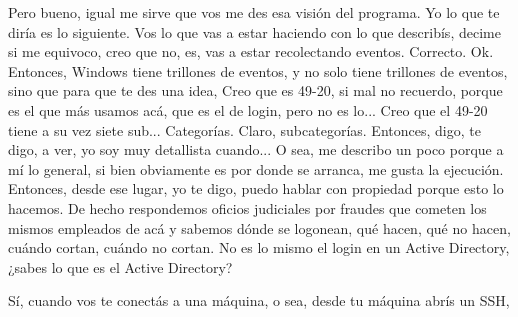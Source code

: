 \begin{description}[leftmargin=0cm, labelsep=0.5cm]
    \item[\textbf{PITA GUILLERMO:}] Pero bueno, igual me sirve que vos me des esa visión del programa. Yo lo que te diría es lo siguiente. Vos lo que vas a estar haciendo con lo que describís, decime si me equivoco, creo que no, es, vas a estar recolectando eventos. Correcto. Ok. Entonces, Windows tiene trillones de eventos, y no solo tiene trillones de eventos, sino que para que te des una idea, Creo que es 49-20, si mal no recuerdo, porque es el que más usamos acá, que es el de login, pero no es lo... Creo que el 49-20 tiene a su vez siete sub... Categorías. Claro, subcategorías. Entonces, digo, te digo, a ver, yo soy muy detallista cuando... O sea, me describo un poco porque a mí lo general, si bien obviamente es por donde se arranca, me gusta la ejecución. Entonces, desde ese lugar, yo te digo, puedo hablar con propiedad porque esto lo hacemos. De hecho respondemos oficios judiciales por fraudes que cometen los mismos empleados de acá y sabemos dónde se logonean, qué hacen, qué no hacen, cuándo cortan, cuándo no cortan. No es lo mismo el login en un Active Directory, ¿sabes lo que es el Active Directory?

    \item[\textbf{MUNTAABSKI FEDERICO:}] Sí, cuando vos te conectás a una máquina, o sea, desde tu máquina abrís un SSH,


\end{description}

